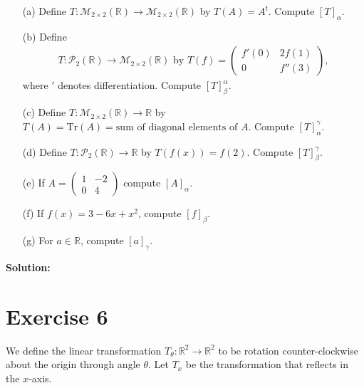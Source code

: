 \documentclass{article}
\begin{document}
\begin{itemize}
    \item[(a)] Define $T : \mathcal{M}_{2\times2}(\mathbb{R}) \to \mathcal{M}_{2\times2}(\mathbb{R})$ by $T(A) = A^t$. Compute $[T]_{\alpha}$.

    \item[(b)] Define 
    \begin{align*}
    T : \mathcal{P}_2(\mathbb{R}) \to \mathcal{M}_{2\times2}(\mathbb{R}) \text{ by } T(f) = \left(\begin{matrix} f'(0) & 2f(1) \\ 0 & f''(3) \end{matrix}\right),
    \end{align*}
    where $'$ denotes differentiation. Compute $[T]_{\beta}^{\alpha}$.

    \item[(c)] Define $T : \mathcal{M}_{2\times2}(\mathbb{R}) \to \mathbb{R}$ by $T(A) = \text{Tr}(A) = \text{sum of diagonal elements of }A$. Compute $[T]_{\alpha}^{\gamma}$.

    \item[(d)] Define $T : \mathcal{P}_2(\mathbb{R}) \to \mathbb{R}$ by $T(f(x)) = f(2)$. Compute $[T]_{\beta}^{\gamma}$.

    \item[(e)] If $A = \left(\begin{matrix} 1 & -2 \\ 0 & 4 \end{matrix}\right)$ compute $[A]_{\alpha}$.

    \item[(f)] If $f(x) = 3 - 6x + x^2$, compute $[f]_{\beta}$.

    \item[(g)] For $a \in \mathbb{R}$, compute $[a]_{\gamma}$.
\end{itemize}

\textbf{Solution: }\\



\newpage

\section*{Exercise 6}
We define the linear transformation $T_{\theta} : \mathbb{R}^2 \to \mathbb{R}^2$ to be rotation counter-clockwise about the origin through angle $\theta$. Let $T_x$ be the transformation that reflects in the $x$-axis.
\end{document}
